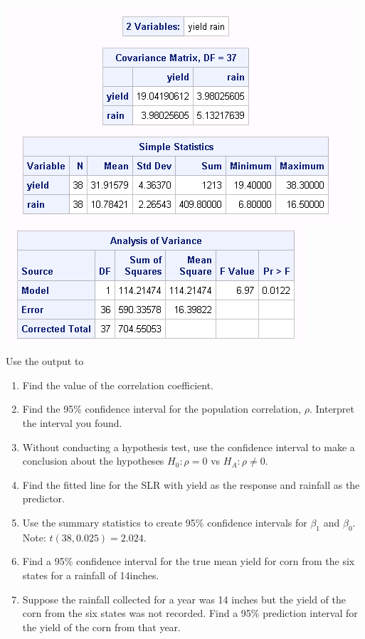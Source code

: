 \begin{center}
\includegraphics[scale=0.7]{cornsummary}\includegraphics[scale=0.7]{cornslranova}
\end{center}

\newpage

Use the output to 
\begin{enumerate}
\item Find the value of the correlation coefficient.  
\item Find the 95\% confidence interval for the population correlation, $\rho$.  Interpret the interval you found.
\item Without conducting a hypothesis test, use the confidence interval to make a conclusion about the hypotheses $H_0: \rho=0$ vs $H_A: \rho\neq 0$.
\item Find the fitted line for the SLR with yield as the response and rainfall as the predictor.
\item Use the summary statistics to create 95\% confidence intervals for $\beta_1$ and $\beta_0$.  Note: $t(38, 0.025)=2.024$.
\item Find a 95\% confidence interval for the true mean yield for corn from the six states for a rainfall of 14inches.
\item Suppose the rainfall collected for a year was 14 inches but the yield of the corn from the six states was not recorded.  Find a 95\% prediction interval for the yield of the corn from that year.
\end{enumerate}

